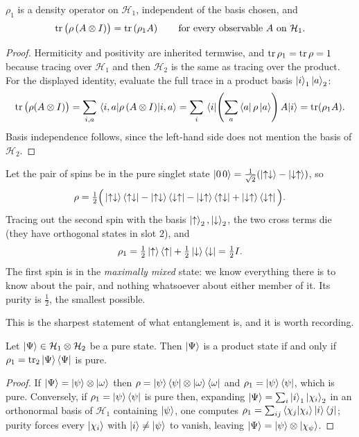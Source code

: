 \documentclass[a4paper]{scrartcl}
\newcommand{\half}{\tfrac{1}{2}}
\newcommand{\ptr}[1]{\operatorname{tr}_{#1}}
\begin{document}
\begin{proposition}
    $\rho_1$ is a density operator on $\mathcal{H}_1$, independent of the basis chosen, and
    $$
    \tr\big( \rho\, (A\otimes I) \big) = \tr\left( \rho_1 A \right) \qquad \text{for every observable } A \text{ on } \mathcal{H}_1.
    $$
\end{proposition}
\begin{proof}
    Hermiticity and positivity are inherited termwise, and $\tr\rho_1 = \tr\rho = 1$ because tracing over $\mathcal{H}_1$ and then $\mathcal{H}_2$ is the same as tracing over the product. For the displayed identity, evaluate the full trace in a product basis $\ket{i}_1\ket{a}_2$:
    $$
    \tr\big(\rho(A\otimes I)\big) = \sum_{i,a}\mel{i,a}{\rho\,(A\otimes I)}{i,a} = \sum_i \mel{i}{\left(\sum_a \bra{a}\rho\ket{a}\right)A}{i} = \tr(\rho_1 A).
    $$
    Basis independence follows, since the left-hand side does not mention the basis of $\mathcal{H}_2$. \qedhere
\end{proof}

\begin{example}
    Let the pair of spins be in the pure singlet state $\ket{0\,0} = \frac{1}{\sqrt2}(\ket{\uparrow\downarrow}-\ket{\downarrow\uparrow})$, so
    $$
    \rho = \half\Big( \ket{\uparrow\downarrow}\bra{\uparrow\downarrow} - \ket{\uparrow\downarrow}\bra{\downarrow\uparrow} - \ket{\downarrow\uparrow}\bra{\uparrow\downarrow} + \ket{\downarrow\uparrow}\bra{\downarrow\uparrow} \Big).
    $$
    Tracing out the second spin with the basis $\ket\uparrow_2, \ket\downarrow_2$, the two cross terms die (they have orthogonal states in slot $2$), and
    $$
    \rho_1 = \half\ket\uparrow\bra\uparrow + \half\ket\downarrow\bra\downarrow = \half I.
    $$
    The first spin is in the \emph{maximally mixed} state: we know everything there is to know about the pair, and nothing whatsoever about either member of it. Its purity is $\half$, the smallest possible.
\end{example}

This is the sharpest statement of what entanglement is, and it is worth recording.

\begin{proposition}
    Let $\ket\Psi \in \mathcal{H}_1\otimes\mathcal{H}_2$ be a pure state. Then $\ket\Psi$ is a product state if and only if $\rho_1 = \ptr{2}\ket\Psi\bra\Psi$ is pure.
\end{proposition}
\begin{proof}
    If $\ket\Psi = \ket\psi\otimes\ket\omega$ then $\rho = \ket\psi\bra\psi\otimes\ket\omega\bra\omega$ and $\rho_1 = \ket\psi\bra\psi$, which is pure. Conversely, if $\rho_1 = \ket\psi\bra\psi$ is pure then, expanding $\ket\Psi = \sum_{i} \ket{i}_1\ket{\chi_i}_2$ in an orthonormal basis of $\mathcal{H}_1$ containing $\ket\psi$, one computes $\rho_1 = \sum_{ij}\braket{\chi_j}{\chi_i}\ket{i}\bra{j}$; purity forces every $\ket{\chi_i}$ with $\ket i \neq \ket\psi$ to vanish, leaving $\ket\Psi = \ket\psi\otimes\ket{\chi_\psi}$.
\end{proof}
\end{document}
